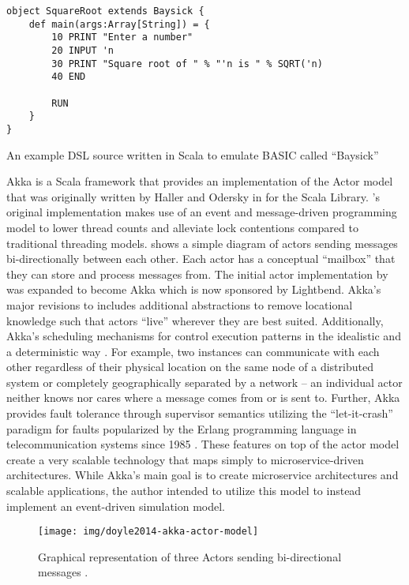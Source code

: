 \begin{listing}[bt!]
\begin{verbatim}
object SquareRoot extends Baysick {
    def main(args:Array[String]) = {
        10 PRINT "Enter a number"
        20 INPUT 'n
        30 PRINT "Square root of " % "'n is " % SQRT('n)
        40 END
        
        RUN
    }
}
\end{verbatim}
\caption{An example DSL source written in Scala to emulate BASIC called ``Baysick'' \cite{FogusBaysick}}
\label{lst:scala-dsl-basic}
\end{listing}

Akka is a Scala framework that provides an implementation of the Actor model \cite{Agha1985} that was originally written by Haller and Odersky in \cite{Haller2009} for the Scala Library. \cite{Haller2009}'s original implementation makes use of an event and message-driven programming model to lower thread counts and alleviate lock contentions compared to traditional threading models.  shows a simple diagram of actors sending messages bi-directionally between each other. Each actor has a conceptual ``mailbox'' that they can store and process messages from. The initial actor implementation by \cite{Haller2009} was expanded to become Akka which is now sponsored by Lightbend. Akka's major revisions to \cite{Haller2009} includes additional abstractions to remove locational knowledge such that actors ``live'' wherever they are best suited. Additionally, Akka's scheduling mechanisms for control \akkaActor{} execution patterns in the idealistic and a deterministic way \cite{TypesafeAkka2015}. For example, two \akkaActor{} instances can communicate with each other regardless of their physical location on the same node of a distributed system or completely geographically separated by a network -- an individual actor neither knows nor cares where a message comes from or is sent to. Further, Akka provides fault tolerance through supervisor semantics utilizing the ``let-it-crash'' paradigm for faults popularized by the Erlang programming language in telecommunication systems since 1985 \cite{Armstrong2010}. These features on top of the actor model create a very scalable technology that maps simply to microservice-driven architectures. While Akka's main goal is to create microservice architectures and scalable applications, the author intended to utilize this model to instead implement an event-driven simulation model.

\begin{figure}[bh!]
    \centering
    \texttt{[image: img/doyle2014-akka-actor-model]}
    \caption{Graphical representation of three Actors sending bi-directional messages \cite{DoyleAkka2014}.}
    \label{fig:doyle2014-akka-actor-model}
\end{figure} 

